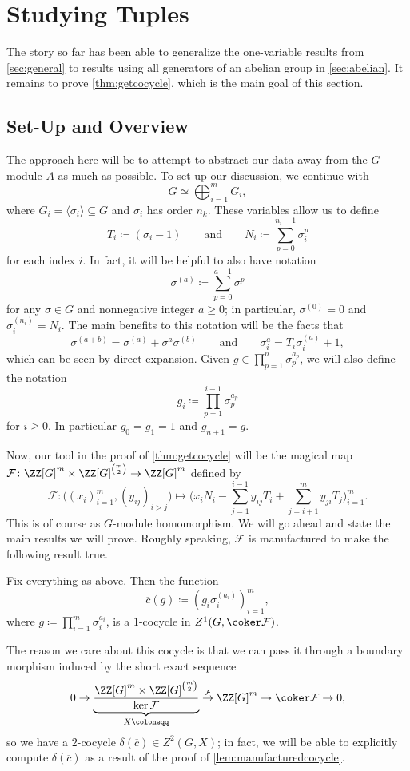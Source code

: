 \documentclass{article}
\numberwithin{equation}{section}
\begin{document}
\section{Studying Tuples}
The story so far has been able to generalize the one-variable results from \autoref{sec:general} to results using all generators of an abelian group in \autoref{sec:abelian}. It remains to prove \autoref{thm:getcocycle}, which is the main goal of this section.

\subsection{Set-Up and Overview}
The approach here will be to attempt to abstract our data away from the $ G$-module $A$ as much as possible. To set up our discussion, we continue with
\[G\simeq\bigoplus_{i=1}^mG_i,\]
where $G_i=\langle\sigma_i\rangle\subseteq G$ and $\sigma_i$ has order $n_k$. These variables allow us to define
\[T_i\coloneqq(\sigma_i-1)\qquad\text{and}\qquad N_i\coloneqq\sum_{p=0}^{n_i-1}\sigma_i^p\]
for each index $i$. In fact, it will be helpful to also have notation
\[\sigma^{(a)}\coloneqq\sum_{p=0}^{a-1}\sigma^p\]
for any $\sigma\in G$ and nonnegative integer $a\ge0$; in particular, $\sigma^{(0)}=0$ and $\sigma_i^{(n_i)}=N_i$. The main benefits to this notation will be the facts that
\[\sigma^{(a+b)}=\sigma^{(a)}+\sigma^a\sigma^{(b)}\qquad\text{and}\qquad\sigma_i^a=T_i\sigma_i^{(a)}+1,\]
which can be seen by direct expansion. Given $g\in\prod_{p=1}^n\sigma_p^{a_p}$, we will also define the notation
\[g_i\coloneqq\prod_{p=1}^{i-1}\sigma_p^{a_p}\]
for $i\ge0$. In particular $g_0=g_1=1$ and $g_{n+1}=g$.

Now, our tool in the proof of \autoref{thm:getcocycle} will be the magical map $\mathcal F\colon\ZZ[G]^m\times\ZZ[G]^{\binom m2}\to\ZZ[G]^m$ defined by
\[\mathcal F\colon\big((x_i)_{i=1}^m,(y_{ij})_{i>j}\big)\mapsto\Bigg(x_iN_i-\sum_{j=1}^{i-1}y_{ij}T_i+\sum_{j=i+1}^my_{ji}T_j\Bigg)_{i=1}^m.\]
This is of course as $G$-module homomorphism. We will go ahead and state the main results we will prove. Roughly speaking, $\mathcal F$ is manufactured to make the following result true.
\begin{lemma} \label{lem:manufacturedcocycle}
	Fix everything as above. Then the function
	\[\overline c(g)\coloneqq\left(g_i\sigma_i^{(a_i)}\right)_{i=1}^m,\]
	where $g\coloneqq\prod_{i=1}^m\sigma_i^{a_i}$, is a $1$-cocycle in $Z^1(G,\coker\mathcal F)$.
\end{lemma}
The reason we care about this cocycle is that we can pass it through a boundary morphism induced by the short exact sequence
\[0\to\underbrace{\frac{\ZZ[G]^m\times\ZZ[G]^{\binom m2}}{\ker\mathcal F}}_{X\coloneqq}\stackrel{\mathcal F}\to\ZZ[G]^m\to\coker\mathcal F\to0,\]
so we have a $2$-cocycle $\delta(\overline c)\in Z^2(G,X)$; in fact, we will be able to explicitly compute $\delta(\overline c)$ as a result of the proof of \autoref{lem:manufacturedcocycle}.
\end{document}
